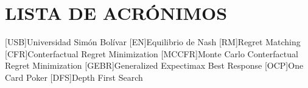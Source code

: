 
\chapter*{LISTA DE ACRÓNIMOS}
\begin{acronym}
[USB]{Universidad Simón Bolívar}
[EN]{Equilibrio de Nash}
[RM]{Regret Matching}
[CFR]{Conterfactual Regret Minimization}
[MCCFR]{Monte Carlo Conterfactual Regret Minimization}
[GEBR]{Generalized Expectimax Best Response}
[OCP]{One Card Poker}
[DFS]{Depth First Search}
\end{acronym}
\clearpage